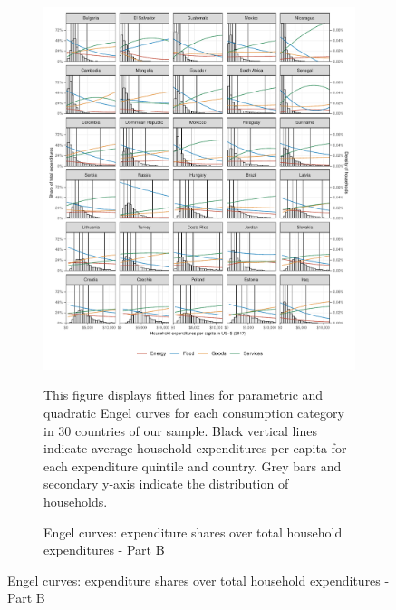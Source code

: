 \begin{figure}[ht!]\ContinuedFloat
   \begin{subfigure}[b]{\textwidth}
  \centering
  \includegraphics{1_Figures/Analysis_Parametric_Engel_Curves/Parametric_EC_0_B.pdf}
  \caption{Engel curves: expenditure shares over total household expenditures - Part B} \label{fig:Engel_2}
  \begin{subcaption2}
    This figure displays fitted lines for parametric and quadratic Engel curves for each consumption category in 30 countries of our sample. Black vertical lines indicate average household expenditures per capita for each expenditure quintile and country. Grey bars and secondary y-axis indicate the distribution of households.
  \end{subcaption2}
\end{subfigure}
\end{figure}

\clearpage

